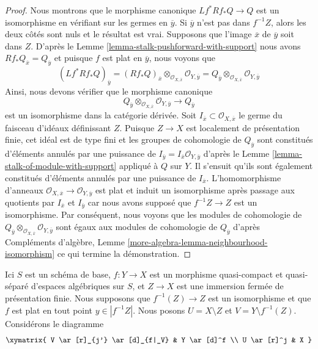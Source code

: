 \begin{proof}
Nous montrons que le morphisme canonique $Lf^*Rf_*Q \to Q$ est un isomorphisme
en vérifiant sur les germes en $\overline{y}$. Si $\overline{y}$ n'est pas
dans $f^{-1}Z$, alors les deux côtés sont nuls et le résultat est vrai.
Supposons que l'image $\overline{x}$ de $\overline{y}$ soit dans $Z$.
D'après le Lemme \ref{lemma-stalk-pushforward-with-support} nous avons
$Rf_*Q_{\overline{x}} = Q_{\overline{y}}$ et puisque $f$ est plat
en $\overline{y}$, nous voyons que
$$
(Lf^*Rf_*Q)_{\overline{y}} =
(Rf_*Q)_{\overline{x}}
\otimes_{\mathcal{O}_{X, \overline{x}}}
\mathcal{O}_{Y, \overline{y}} =
Q_{\overline{y}} \otimes_{\mathcal{O}_{X, \overline{x}}}
\mathcal{O}_{Y, \overline{y}}
$$
Ainsi, nous devons vérifier que le morphisme canonique
$$
Q_{\overline{y}} \otimes_{\mathcal{O}_{X, \overline{x}}}
\mathcal{O}_{Y, \overline{y}}
\longrightarrow Q_{\overline{y}}
$$
est un isomorphisme dans la catégorie dérivée. Soit
$I_{\overline{x}} \subset \mathcal{O}_{X, \overline{x}}$ le
germe du faisceau d'idéaux définissant $Z$. Puisque $Z \to X$ est localement de
présentation finie, cet idéal est de type fini et les
groupes de cohomologie de $Q_{\overline{y}}$
sont constitués d'éléments annulés par une puissance de $I_{\overline{y}} = I_{\overline{x}}\mathcal{O}_{Y, \overline{y}}$ d'après le Lemme \ref{lemma-stalk-of-module-with-support} appliqué à $Q$ sur $Y$. Il s'ensuit qu'ils sont également constitués d'éléments annulés par une puissance de $I_{\overline{x}}$. 
L'homomorphisme d'anneaux 
$\mathcal{O}_{X, \overline{x}} \to \mathcal{O}_{Y, \overline{y}}$ 
est plat et induit un isomorphisme après passage aux quotients par 
$I_{\overline{x}}$ et $I_{\overline{y}}$ car nous avons supposé que 
$f^{-1}Z \to Z$ est un isomorphisme. Par conséquent, nous voyons que 
les modules de cohomologie de 
$Q_{\overline{y}} \otimes_{\mathcal{O}_{X, \overline{x}}}
\mathcal{O}_{Y, \overline{y}}$ 
sont égaux aux modules de cohomologie de $Q_{\overline{y}}$ d'après 
Compléments d'algèbre, Lemme \ref{more-algebra-lemma-neighbourhood-isomorphism} 
ce qui termine la démonstration. 
\end{proof}

\begin{situation}
\label{situation-formal-glueing}
Ici $S$ est un schéma de base, $f : Y \to X$ est un morphisme quasi-compact et quasi-séparé d'espaces algébriques sur $S$, et $Z \to X$ est une immersion fermée de présentation finie. Nous supposons que $f^{-1}(Z) \to Z$ est un isomorphisme et que $f$ est plat en tout point $y \in |f^{-1}Z|$. Nous posons $U = X \setminus Z$ et $V = Y \setminus f^{-1}(Z)$.
Considérons le diagramme
$$
\xymatrix{
V \ar[r]_{j'} \ar[d]_{f|_V} & Y \ar[d]^f \\
U \ar[r]^j & X
}
$$
\end{situation}

